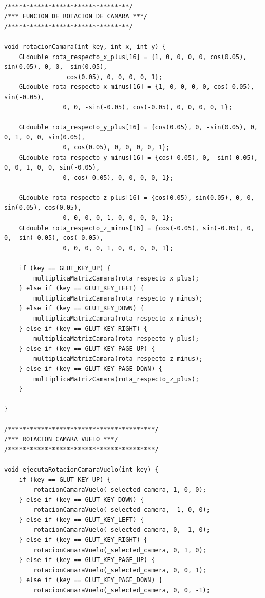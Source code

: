 \documentclass[12pt,a4paper]{article}
\begin{document}
\begin{lstlisting}

/*********************************/
/*** FUNCION DE ROTACION DE CAMARA ***/
/*********************************/

void rotacionCamara(int key, int x, int y) {
    GLdouble rota_respecto_x_plus[16] = {1, 0, 0, 0, 0, cos(0.05), sin(0.05), 0, 0, -sin(0.05),
    			 cos(0.05), 0, 0, 0, 0, 1};
    GLdouble rota_respecto_x_minus[16] = {1, 0, 0, 0, 0, cos(-0.05), sin(-0.05), 
    			0, 0, -sin(-0.05), cos(-0.05), 0, 0, 0, 0, 1};

    GLdouble rota_respecto_y_plus[16] = {cos(0.05), 0, -sin(0.05), 0, 0, 1, 0, 0, sin(0.05), 
    			0, cos(0.05), 0, 0, 0, 0, 1};
    GLdouble rota_respecto_y_minus[16] = {cos(-0.05), 0, -sin(-0.05), 0, 0, 1, 0, 0, sin(-0.05), 
    			0, cos(-0.05), 0, 0, 0, 0, 1};

    GLdouble rota_respecto_z_plus[16] = {cos(0.05), sin(0.05), 0, 0, -sin(0.05), cos(0.05), 
    			0, 0, 0, 0, 1, 0, 0, 0, 0, 1};
    GLdouble rota_respecto_z_minus[16] = {cos(-0.05), sin(-0.05), 0, 0, -sin(-0.05), cos(-0.05), 
    			0, 0, 0, 0, 1, 0, 0, 0, 0, 1};

    if (key == GLUT_KEY_UP) {
        multiplicaMatrizCamara(rota_respecto_x_plus);
    } else if (key == GLUT_KEY_LEFT) {
        multiplicaMatrizCamara(rota_respecto_y_minus);
    } else if (key == GLUT_KEY_DOWN) {
        multiplicaMatrizCamara(rota_respecto_x_minus);
    } else if (key == GLUT_KEY_RIGHT) {
        multiplicaMatrizCamara(rota_respecto_y_plus);
    } else if (key == GLUT_KEY_PAGE_UP) {
        multiplicaMatrizCamara(rota_respecto_z_minus);
    } else if (key == GLUT_KEY_PAGE_DOWN) {
        multiplicaMatrizCamara(rota_respecto_z_plus);
    }

}

/****************************************/
/*** ROTACION CAMARA VUELO ***/
/****************************************/

void ejecutaRotacionCamaraVuelo(int key) {
    if (key == GLUT_KEY_UP) {
        rotacionCamaraVuelo(_selected_camera, 1, 0, 0);
    } else if (key == GLUT_KEY_DOWN) {
        rotacionCamaraVuelo(_selected_camera, -1, 0, 0);
    } else if (key == GLUT_KEY_LEFT) {
        rotacionCamaraVuelo(_selected_camera, 0, -1, 0);
    } else if (key == GLUT_KEY_RIGHT) {
        rotacionCamaraVuelo(_selected_camera, 0, 1, 0);
    } else if (key == GLUT_KEY_PAGE_UP) {
        rotacionCamaraVuelo(_selected_camera, 0, 0, 1);
    } else if (key == GLUT_KEY_PAGE_DOWN) {
        rotacionCamaraVuelo(_selected_camera, 0, 0, -1);


\end{lstlisting}
\end{document}

